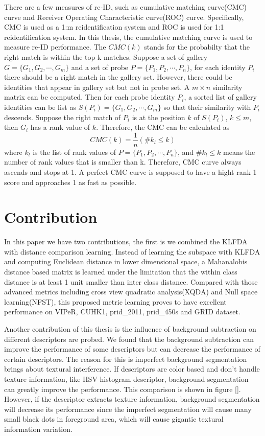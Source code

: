 There are a few measures of re-ID, such as cumulative matching curve(CMC) curve and Receiver Operating Characteristic curve(ROC) curve. Specifically, CMC is used as a 1:m reidentification system and ROC is used for 1:1 reidentification system.  In this thesis, the cumulative matching curve is used to measure re-ID performance. The $CMC(k)$  stands for the probabilty that the right match is within the top k matches. Suppose a set of gallery $G = \{G_1,G_2,\cdots,G_m\}$ and a set of probe $P = \{P_1,P_2,\cdots,P_n\}$, for each identity $P_i$ there should be a right match in the gallery set. However, there could be identities that appear in gallery set but not in probe set. A $m\times n$ similarity matrix can be computed. Then for each probe identity $P_i$, a sorted list of gallery identities can be list as $S(P_i) = \{{G_{1},G_{2},\cdots,G_{m}}\}$ so that their similarity with $P_i$ descends. Suppose the right match of $P_i$ is at the position $k$ of $S(P_i)$, $k\le m$, then $G_i$ has a rank value of $k$. Therefore, the CMC can be calculated as 
\begin{equation}
CMC(k) = \frac{1}{n}(\#k_l\le k)
\end{equation}
where $k_l$ is the list of rank values of $P = \{P_1,P_2,\cdots,P_n\}$, and $\#k_l\le k$ means the number of rank values that is smaller than k.  Therefore, CMC curve always ascends and stops at 1.  A perfect CMC curve is supposed to have a hight rank 1 score and approaches 1 as fast as possible.




\section{Contribution}

In this paper we have two contributions, the first is we combined the KLFDA with distance comparison learning. Instead of learning the subspace with KLFDA and computing Euclidean distance in lower dimensional space, a Mahanalobis distance based matrix is learned under the limitation that the within class distance is at least 1 unit smaller than inter class distance. Compared with those advanced metrics including cross view quadratic analysis(XQDA) and Null space learning(NFST), this proposed metric learning proves to have excellent performance on VIPeR, CUHK1, prid\_2011, prid\_450s and GRID dataset.

Another contribution of this thesis is the influence of background subtraction on different descriptors are probed. We found that the background subtraction can improve the performance of some descriptors but can decrease the performance of  certain descriptors. The reason for this is imperfect background segmentation brings about textural interference. If descriptors are color based and don't handle texture information, like HSV histogram descriptor, background segmentation can greatly improve the performance. This comparison is shown in figure []. However, if the descriptor extracts texture information, background segmentation will decrease its performance since the imperfect segmentation will cause many small black dots in foreground area, which will cause gigantic textural information variation. 


